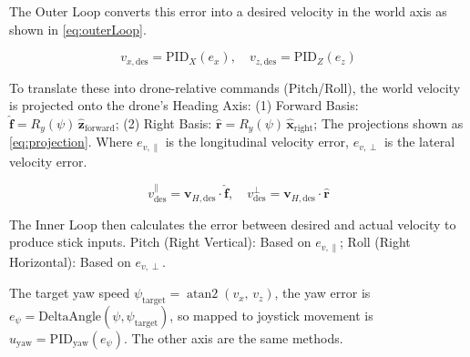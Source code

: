 The Outer Loop converts this error into a desired velocity in the world axis as shown in \cref{eq:outerLoop}.

\begin{equation}\label{eq:outerLoop}
    v_{x,\text{des}} = \text{PID}_X(e_x),\quad v_{z,\text{des}} = \text{PID}_Z(e_z)
\end{equation}

To translate these into drone-relative commands (Pitch/Roll), the world velocity is projected onto the drone's Heading Axis: (1) Forward Basis: $\hat{\mathbf{f}} = R_y(\psi)\,\hat{\mathbf{z}}_{\text{forward}}$; (2) Right Basis: $\hat{\mathbf{r}} = R_y(\psi)\,\hat{\mathbf{x}}_{\text{right}}$; The projections shown as \cref{eq:projection}. Where $e_{v,\parallel}$ is the longitudinal velocity error,  $e_{v,\perp}$ is the lateral velocity error.

\begin{equation}\label{eq:projection}
    v^{\parallel}_{\text{des}} = \mathbf{v}_{H,\text{des}}\cdot\hat{\mathbf{f}}, \quad v^{\perp}_{\text{des}} = \mathbf{v}_{H,\text{des}}\cdot\hat{\mathbf{r}}
\end{equation}

The Inner Loop then calculates the error between desired and actual velocity to produce stick inputs. Pitch (Right Vertical): Based on $e_{v,\parallel}$; Roll (Right Horizontal): Based on $e_{v,\perp}$.

The target yaw speed $\psi_{\text{target}} = \operatorname{atan2}(v_x,\,v_z)$, the yaw error is  $e_\psi = \text{DeltaAngle}(\psi, \psi_{\text{target}})$, so mapped to joystick movement is $u_{\text{yaw}} = \text{PID}_{\text{yaw}}(e_\psi)$. The other axis are the same methods.
